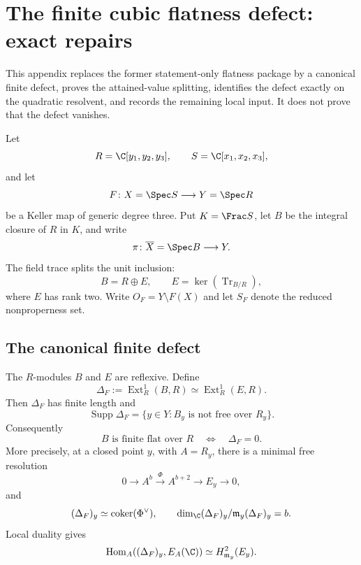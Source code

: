 \section{The finite cubic flatness defect: exact repairs}
\label{app:flatness-defect-repairs}

This appendix replaces the former statement-only flatness package by a
canonical finite defect, proves the attained-value splitting, identifies the
defect exactly on the quadratic resolvent, and records the remaining local
input.  It does not prove that the defect vanishes.

Let
\[
R=\C[y_1,y_2,y_3],\qquad S=\C[x_1,x_2,x_3],
\]
and let
\[
F\colon X=\Spec S\longrightarrow Y=\Spec R
\]
be a Keller map of generic degree three.  Put \(K=\Frac S\), let \(B\) be the
integral closure of \(R\) in \(K\), and write
\[
\pi\colon\overline X=\Spec B\longrightarrow Y.
\]
The field trace splits the unit inclusion:
\[
B=R\oplus E,\qquad E=\ker(\operatorname{Tr}_{B/R}),
\]
where \(E\) has rank two.  Write \(O_F=Y\setminus F(X)\) and let \(S_F\)
denote the reduced nonproperness set.

\subsection{The canonical finite defect}

\begin{proposition}
\label{prop:cubic-ext-defect}
The \(R\)-modules \(B\) and \(E\) are reflexive.  Define
\[
\Delta_F:=\operatorname{Ext}^1_R(B,R)
          \simeq\operatorname{Ext}^1_R(E,R).
\]
Then \(\Delta_F\) has finite length and
\[
\operatorname{Supp}\Delta_F
 =\{y\in Y:B_y\text{ is not free over }R_y\}.
\]
Consequently
\[
B\text{ is finite flat over }R
\quad\Longleftrightarrow\quad
\Delta_F=0.
\]
More precisely, at a closed point \(y\), with \(A=R_y\), there is a minimal
free resolution
\[
0\longrightarrow A^b\xrightarrow{\Phi}A^{b+2}
 \longrightarrow E_y\longrightarrow0,
\]
and
\[
(\Delta_F)_y\simeq\operatorname{coker}(\Phi^\vee),
\qquad
\dim_\C (\Delta_F)_y/\mathfrak m_y(\Delta_F)_y=b.
\]
Local duality gives
\[
\operatorname{Hom}_A((\Delta_F)_y,E_A(\C))
 \simeq H^2_{\mathfrak m_y}(E_y).
\]
\end{proposition}

